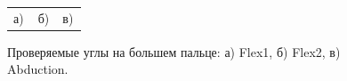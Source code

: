 \begin{figure}[H]
\begin{minipage}[h]{0.32\linewidth}
\end{minipage}
\begin{minipage}[h]{1\linewidth}
\begin{tabular}{p{0.32\linewidth}p{0.32\linewidth}p{0.32\linewidth}}
\centering а) & \centering б) & \centering в) \\
\end{tabular}
\end{minipage}
\vspace*{-1cm}
\caption{Проверяемые углы на большем пальце: а) Flex1, б) Flex2, в) Abduction.}
\label{fig:finger_motion_type_1}
\end{figure}


